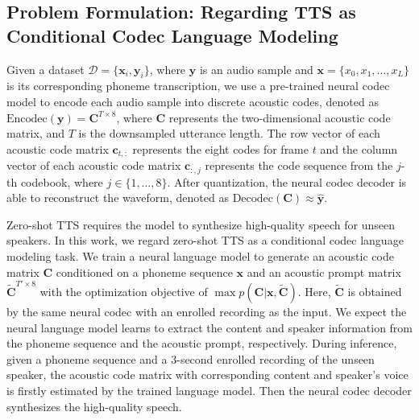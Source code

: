 \documentclass{article}
\theoremstyle{plain}
\theoremstyle{definition}
\theoremstyle{remark}
\begin{document}
\subsection{Problem Formulation: Regarding TTS as Conditional Codec Language Modeling}
Given a dataset $\mathcal{D} = \{\mathbf{x}_i , \mathbf{y}_i \}$, where $\mathbf{y} $ is an audio sample and $\mathbf{x} = \{ x_0, x_1, \ldots, x_L \}$ is its corresponding phoneme transcription, we use a pre-trained neural codec model to encode each audio sample into discrete acoustic codes, denoted as $ \text{Encodec}(\mathbf{y}) = \mathbf{C}^{T \times 8}$, where $\mathbf{C}$ represents the two-dimensional acoustic code matrix, and $T$ is the downsampled utterance length. The row vector of each acoustic code matrix $\mathbf{c}_{t,:}$ represents the eight codes for frame $t$ and the column vector of each acoustic code matrix $\mathbf{c}_{:, j}$ represents the code sequence from the $j$-th codebook, where $j \in \{1, \ldots , 8\}$. After quantization, the neural codec decoder is able to reconstruct the waveform, denoted as  $ \text{Decodec}(\mathbf{C})\approx \hat{\mathbf{y}}$. 

Zero-shot TTS requires the model to synthesize high-quality speech for unseen speakers. 
In this work, we regard zero-shot TTS as a conditional codec language modeling task. We train a neural language model to generate an acoustic code matrix $\mathbf{C}$ conditioned on a phoneme sequence $\mathbf{x}$ and  an acoustic prompt matrix $\mathbf{\tilde{C}}^{T'\times 8}$ with the optimization objective of $\max p (\mathbf{C} |\mathbf{x}, \mathbf{\tilde{C}})$. Here, $\mathbf{\tilde{C}}$ is obtained by the same neural codec with an enrolled recording as the input. We expect the  neural language model learns to extract the content and speaker information from the phoneme sequence and the acoustic prompt, respectively.
During inference, given a phoneme sequence and a 3-second enrolled recording of the unseen speaker, the acoustic code matrix with corresponding content and speaker's voice is firstly estimated by the trained language model. Then the neural codec decoder synthesizes the high-quality speech.

\end{document}
